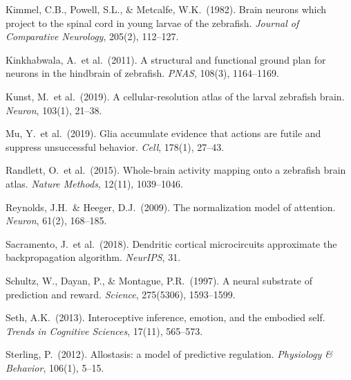 \documentclass[11pt,a4paper]{article}
\begin{document}
\begin{small}
\noindent
Kimmel, C.B., Powell, S.L., \& Metcalfe, W.K.\ (1982). Brain neurons which project to the spinal cord in young larvae of the zebrafish.
\textit{Journal of Comparative Neurology}, 205(2), 112--127.

\noindent
Kinkhabwala, A.\ et al.\ (2011). A structural and functional ground plan for neurons in the hindbrain of zebrafish.
\textit{PNAS}, 108(3), 1164--1169.

\noindent
Kunst, M.\ et al.\ (2019). A cellular-resolution atlas of the larval zebrafish brain.
\textit{Neuron}, 103(1), 21--38.

\noindent
Mu, Y.\ et al.\ (2019). Glia accumulate evidence that actions are futile and suppress unsuccessful behavior.
\textit{Cell}, 178(1), 27--43.

\noindent
Randlett, O.\ et al.\ (2015). Whole-brain activity mapping onto a zebrafish brain atlas.
\textit{Nature Methods}, 12(11), 1039--1046.

\noindent
Reynolds, J.H.\ \& Heeger, D.J.\ (2009). The normalization model of attention.
\textit{Neuron}, 61(2), 168--185.

\noindent
Sacramento, J.\ et al.\ (2018). Dendritic cortical microcircuits approximate the backpropagation algorithm.
\textit{NeurIPS}, 31.

\noindent
Schultz, W., Dayan, P., \& Montague, P.R.\ (1997). A neural substrate of prediction and reward.
\textit{Science}, 275(5306), 1593--1599.

\noindent
Seth, A.K.\ (2013). Interoceptive inference, emotion, and the embodied self.
\textit{Trends in Cognitive Sciences}, 17(11), 565--573.

\noindent
Sterling, P.\ (2012). Allostasis: a model of predictive regulation.
\textit{Physiology \& Behavior}, 106(1), 5--15.
\end{small}
\end{document}
